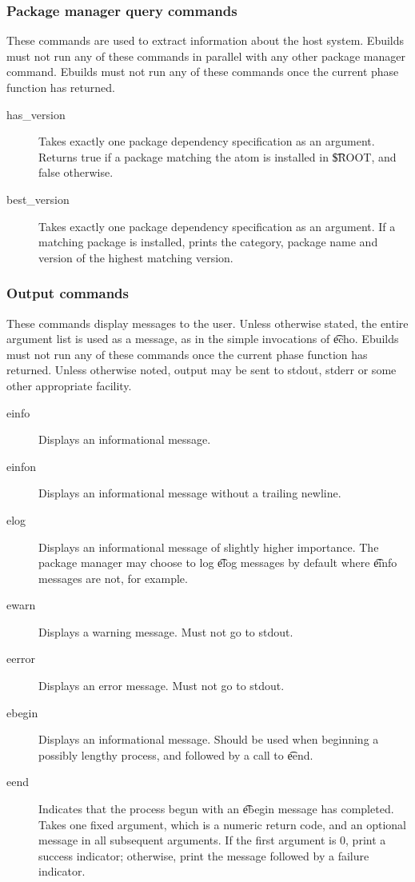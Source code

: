 \subsubsection{Package manager query commands}
These commands are used to extract information about the host system. Ebuilds must not run any of
these commands in parallel with any other package manager command. Ebuilds must not run any of
these commands once the current phase function has returned.
\begin{description}
\item[has\_version] Takes exactly one package dependency specification as an argument. Returns
    true if a package matching the atom is installed in \t{\$ROOT}, and false otherwise.
\item[best\_version] Takes exactly one package dependency specification as an argument. If a
    matching package is installed, prints the category, package name and version of the highest
    matching version.
\end{description}

\subsubsection{Output commands}
These commands display messages to the user. Unless otherwise stated, the entire argument list is
used as a message, as in the simple invocations of \t{echo}. Ebuilds must not run any of these
commands once the current phase function has returned. Unless otherwise noted, output may be sent to
stdout, stderr or some other appropriate facility.
\begin{description}
\item[einfo] Displays an informational message.
\item[einfon] Displays an informational message without a trailing newline.
\item[elog] Displays an informational message of slightly higher importance. The package
    manager may choose to log \t{elog} messages by default where \t{einfo} messages are not, for
    example.
\item[ewarn] Displays a warning message. Must not go to stdout.
\item[eerror] Displays an error message. Must not go to stdout.
\item[ebegin] Displays an informational message. Should be used when beginning a possibly
    lengthy process, and followed by a call to \t{eend}.
\item[eend] Indicates that the process begun with an \t{ebegin} message has completed. Takes one
    fixed argument, which is a numeric return code, and an optional message in all subsequent
    arguments.  If the first argument is 0, print a success indicator; otherwise, print the message
    followed by a failure indicator.
\end{description}


